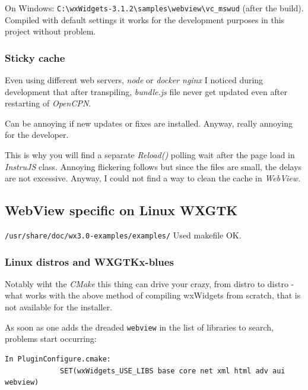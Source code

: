 \documentclass[11pt]{article}
\begin{document}
    On Windows:
\texttt{C:\textbackslash{}wxWidgets-3.1.2\textbackslash{}samples\textbackslash{}webview\textbackslash{}vc\_mswud}
(after the build). Compiled with default settings it works for the
development purposes in this project without problem.

    \hypertarget{sticky-cache}{%
\subsubsection{Sticky cache}\label{sticky-cache}}

    Even using different web servers, \emph{node} or \emph{docker nginx} I
noticed during development that after transpiling, \emph{bundle.js} file
never get updated even after restarting of \emph{OpenCPN}.

    Can be annoying if new updates or fixes are installed. Anyway, really
annoying for the developer.

    This is why you will find a separate \emph{Reload()} polling wait after
the page load in \emph{InstruJS} class. Annoying flickering follows but
since the files are small, the delays are not excessive. Anyway, I could
not find a way to clean the cache in \emph{WebView}.

    \hypertarget{webview-specific-on-linux-wxgtk}{%
\subsection{\texorpdfstring{WebView specific on Linux
\textbf{WXGTK}}{WebView specific on Linux WXGTK}}\label{webview-specific-on-linux-wxgtk}}

    \texttt{/usr/share/doc/wx3.0-examples/examples/} Used makefile OK.

    \hypertarget{linux-distros-and-wxgtkx-blues}{%
\subsubsection{Linux distros and
WXGTKx-blues}\label{linux-distros-and-wxgtkx-blues}}

    Notably wiht the \emph{CMake} this thing can drive your crazy, from
distro to distro - what works with the above method of compiling
wxWidgets from scratch, that is not available for the installer.

    As soon as one adds the dreaded \texttt{webview} in the list of
libraries to search, problems start occurring:

    \begin{verbatim}
In PluginConfigure.cmake:
             SET(wxWidgets_USE_LIBS base core net xml html adv aui webview)
\end{verbatim}
\end{document}

